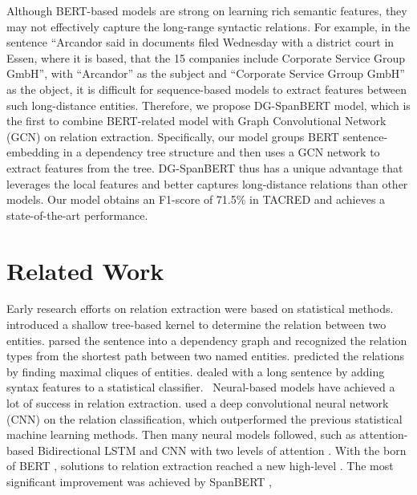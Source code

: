 \documentclass{article}
\begin{document}
Although BERT-based models are strong on learning rich semantic features, they may not effectively capture the long-range syntactic relations.
For example, in the sentence ``Arcandor said in documents filed Wednesday with a district court in Essen, where it is based, that the 15 companies include Corporate Service Group GmbH'', with  ``Arcandor'' as the subject and ``Corporate Service Grroup GmbH'' as the object, it is difficult for sequence-based models to extract features between such long-distance entities. Therefore,  we propose DG-SpanBERT model, which is the first to combine BERT-related model with Graph Convolutional Network (GCN) on relation extraction. Specifically, our model groups BERT sentence-embedding in a dependency tree structure and then uses a GCN network to extract features from the tree. DG-SpanBERT thus has a unique advantage that leverages the local features and better captures long-distance relations than other models. Our model obtains an F1-score of 71.5\% in TACRED and achieves a state-of-the-art performance.


\section{Related Work}

Early research efforts on relation extraction were based on statistical methods. \cite{Zelenko:2003:KMR:944919.944964} introduced a shallow tree-based kernel to determine the relation between two entities. \cite{Bunescu:2005:SPD:1220575.1220666} parsed the sentence into a dependency graph and recognized the relation types from the shortest path between two named entities. \cite{mcdonald2005simple} predicted the relations by finding maximal cliques of entities. \cite{mintz2009distant} dealed with a long sentence by adding syntax features to a statistical classifier. 
\
Neural-based models have achieved a lot of success in relation extraction. \cite{zeng2014relation} used a deep convolutional neural network (CNN) on the relation classification, which outperformed the previous statistical machine learning methods. Then many neural models followed, such as attention-based Bidirectional LSTM \cite{zhou2016attention} and CNN with two levels of attention \cite{wang2016relation}.  
With the born of BERT \cite{devlin_bert}, solutions to relation extraction reached a new high-level \cite{shi2019simple}. 
The most significant improvement was achieved by SpanBERT \cite{joshi2019spanbert},
\end{document}

